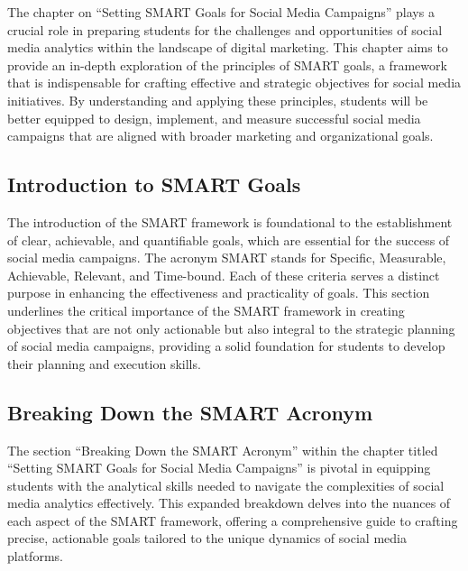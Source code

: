 \documentclass[
]{book}
\begin{document}
The chapter on ``Setting SMART Goals for Social Media Campaigns'' plays a crucial role in preparing students for the challenges and opportunities of social media analytics within the landscape of digital marketing. This chapter aims to provide an in-depth exploration of the principles of SMART goals, a framework that is indispensable for crafting effective and strategic objectives for social media initiatives. By understanding and applying these principles, students will be better equipped to design, implement, and measure successful social media campaigns that are aligned with broader marketing and organizational goals.

\hypertarget{introduction-to-smart-goals}{%
\subsection*{Introduction to SMART Goals}\label{introduction-to-smart-goals}}

The introduction of the SMART framework is foundational to the establishment of clear, achievable, and quantifiable goals, which are essential for the success of social media campaigns. The acronym SMART stands for Specific, Measurable, Achievable, Relevant, and Time-bound. Each of these criteria serves a distinct purpose in enhancing the effectiveness and practicality of goals. This section underlines the critical importance of the SMART framework in creating objectives that are not only actionable but also integral to the strategic planning of social media campaigns, providing a solid foundation for students to develop their planning and execution skills.

\hypertarget{breaking-down-the-smart-acronym}{%
\subsection*{Breaking Down the SMART Acronym}\label{breaking-down-the-smart-acronym}}

The section ``Breaking Down the SMART Acronym'' within the chapter titled ``Setting SMART Goals for Social Media Campaigns'' is pivotal in equipping students with the analytical skills needed to navigate the complexities of social media analytics effectively. This expanded breakdown delves into the nuances of each aspect of the SMART framework, offering a comprehensive guide to crafting precise, actionable goals tailored to the unique dynamics of social media platforms.
\end{document}
